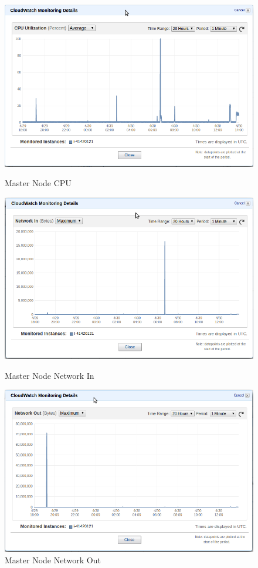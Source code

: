 \begin{figure}[!htb]
  \includegraphics[width=\linewidth]{pics/master_cpu.png}
  \caption{Master Node CPU}\label{fig:master_cpu}
\endminipage\hfill
{}
  \includegraphics[width=\linewidth]{pics/master_network_in.png}
  \caption{Master Node Network In}\label{fig:master_in}
\endminipage\hfill
{}
  \includegraphics[width=\linewidth]{pics/master_network_out.png}
  \caption{Master Node Network Out}\label{fig:master_out}
\endminipage\hfill
\end{figure}

